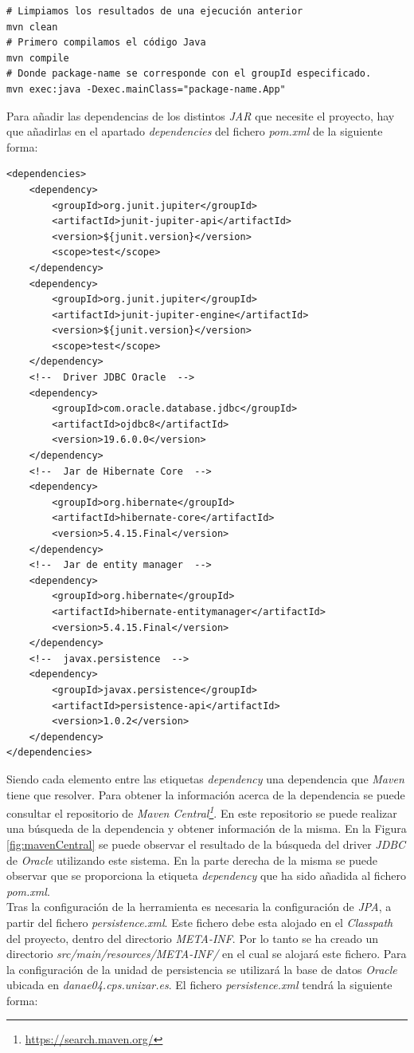 \documentclass[11pt,a4paper]{article}
\begin{document}
\begin{lstlisting}
# Limpiamos los resultados de una ejecución anterior
mvn clean
# Primero compilamos el código Java
mvn compile
# Donde package-name se corresponde con el groupId especificado.
mvn exec:java -Dexec.mainClass="package-name.App"
\end{lstlisting}

Para añadir las dependencias de los distintos \emph{JAR} que necesite el proyecto, hay que añadirlas en el apartado \emph{dependencies} del fichero \emph{pom.xml} de la siguiente forma:

\begin{lstlisting}
<dependencies>
	<dependency>
		<groupId>org.junit.jupiter</groupId>
		<artifactId>junit-jupiter-api</artifactId>
		<version>${junit.version}</version>
		<scope>test</scope>
	</dependency>
	<dependency>
		<groupId>org.junit.jupiter</groupId>
		<artifactId>junit-jupiter-engine</artifactId>
		<version>${junit.version}</version>
		<scope>test</scope>
	</dependency>
	<!--  Driver JDBC Oracle  -->
	<dependency>
		<groupId>com.oracle.database.jdbc</groupId>
		<artifactId>ojdbc8</artifactId>
		<version>19.6.0.0</version>
	</dependency>
	<!--  Jar de Hibernate Core  -->
	<dependency>
		<groupId>org.hibernate</groupId>
		<artifactId>hibernate-core</artifactId>
		<version>5.4.15.Final</version>
	</dependency>
	<!--  Jar de entity manager  -->
	<dependency>
		<groupId>org.hibernate</groupId>
		<artifactId>hibernate-entitymanager</artifactId>
		<version>5.4.15.Final</version>
	</dependency>
	<!--  javax.persistence  -->
	<dependency>
		<groupId>javax.persistence</groupId>
		<artifactId>persistence-api</artifactId>
		<version>1.0.2</version>
	</dependency>
</dependencies>
\end{lstlisting}

Siendo cada elemento entre las etiquetas \emph{dependency} una dependencia que \emph{Maven} tiene que resolver. Para obtener la información acerca de la dependencia se puede consultar el repositorio de \emph{Maven Central\footnote{\url{https://search.maven.org/}}}. En este repositorio se puede realizar una búsqueda de la dependencia y obtener información de la misma. En la Figura \ref{fig:mavenCentral} se puede observar el resultado de la búsqueda del driver \emph{JDBC} de \emph{Oracle} utilizando este sistema. En la parte derecha de la misma se puede observar que se proporciona la etiqueta \emph{dependency} que ha sido añadida al fichero \emph{pom.xml}.\\

Tras la configuración de la herramienta es necesaria la configuración de \emph{JPA}, a partir del fichero \emph{persistence.xml}. Este fichero debe esta alojado en el \emph{Classpath} del proyecto, dentro del directorio \emph{META-INF}. Por lo tanto se ha creado un directorio \emph{src/main/resources/META-INF/} en el cual se alojará este fichero. Para la configuración de la unidad de persistencia se utilizará la base de datos \emph{Oracle} ubicada en \emph{danae04.cps.unizar.es}. El fichero \emph{persistence.xml} tendrá la siguiente forma:
\end{document}
